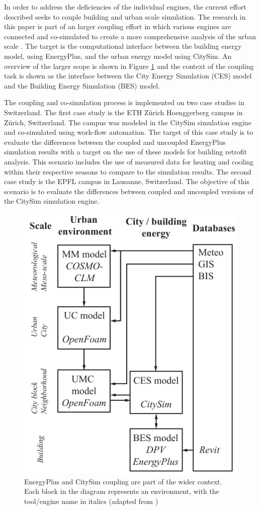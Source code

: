 \documentclass{tBPS2e}
\theoremstyle{plain}
\theoremstyle{definition}
\theoremstyle{remark}
\begin{document}
In order to address the deficiencies of the individual engines, the current effort described seeks to couple building and urban scale simulation. The research in this paper is part of an larger coupling effort in which various engines are connected and co-simulated to create a more comprehensive analysis of the urban scale \citep{Dorer:2013vt}. The target is the computational interface between the building energy model, using EnergyPlus, and the urban energy model using CitySim. An overview of the larger scope is shown in Figure \ref{fig:UMEM} and the context of the coupling task is shown as the interface between the City Energy Simulation (CES) model and the Building Energy Simulation (BES) model.

The coupling and co-simulation process is implemented on two case studies in Switzerland. The first case study is the ETH Z\"urich Hoenggerberg campus in Z\"urich, Switzerland. The campus was modeled in the CitySim simulation engine and co-simulated using work-flow automation. The target of this case study is to evaluate the differences between the coupled and uncoupled EnergyPlus simulation results with a target on the use of these models for building retrofit analysis. This scenario includes the use of measured data for heating and cooling within their respective seasons to compare to the simulation results. The second case study is the EPFL campus in Lausanne, Switzerland. The objective of this scenario is to evaluate the differences between coupled and uncoupled versions of the CitySim simulation engine. 

\begin{figure}
\centering
\includegraphics[scale=0.7]{figures/UMEM_overview_new}
\caption{EnergyPlus and CitySim coupling are part of the wider context. Each block in the diagram represents an environment, with the tool/engine name in italics (adapted from \citep{Dorer:2013vt})}
\label{fig:UMEM}
\end{figure}
\end{document}
